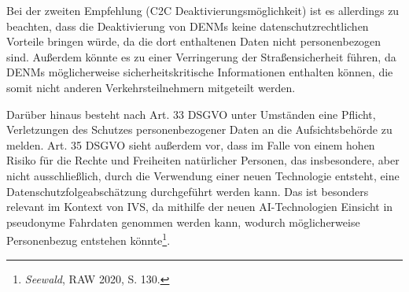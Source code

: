Bei der zweiten Empfehlung (C2C Deaktivierungsmöglichkeit)  ist es allerdings zu beachten, dass die Deaktivierung von DENMs keine datenschutzrechtlichen Vorteile bringen würde, da die dort enthaltenen Daten nicht personenbezogen sind. Außerdem könnte es zu einer Verringerung der Straßensicherheit führen, da DENMs möglicherweise sicherheitskritische Informationen enthalten können, die somit nicht anderen Verkehrsteilnehmern mitgeteilt werden. 

Darüber hinaus besteht nach Art. 33 DSGVO unter Umständen eine Pflicht, Verletzungen des Schutzes personenbezogener Daten an die Aufsichtsbehörde zu melden. Art. 35 DSGVO sieht außerdem vor, dass im Falle von einem hohen Risiko für die Rechte und Freiheiten natürlicher Personen, das insbesondere, aber nicht ausschließlich, durch die Verwendung einer neuen Technologie entsteht, eine Datenschutzfolgeabschätzung durchgeführt werden kann. Das ist besonders relevant im Kontext von IVS, da mithilfe der neuen AI-Technologien Einsicht in pseudonyme Fahrdaten genommen werden kann, wodurch möglicherweise Personenbezug entstehen könnte\footnote{\emph{Seewald}, RAW 2020, S. 130.}. \nocite{Seewald2018}

